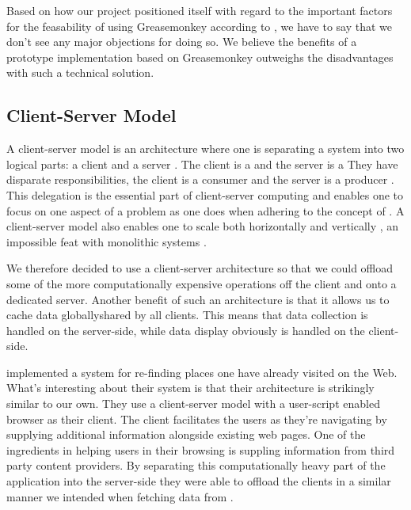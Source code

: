 Based on how our project positioned itself with regard to the important
factors for the feasability of using Greasemonkey
according to \citet{laird07}, we have to say that we
don't see any major objections for doing so.
We believe the benefits of a prototype implementation
based on Greasemonkey outweighs the disadvantages with such a technical
solution.

\subsection{Client-Server Model}

A client-server model is an architecture where one is separating a system into
two logical parts: a client and a server \citep[]{lewandowski98}. The
client is a 
and the server is a 
They have disparate responsibilities, the client is a consumer and the
server is a producer \citep[]{lewandowski98}. This delegation is the
essential part of client-server computing and enables one to focus on one
aspect of a problem as one does when adhering to the concept of
 \citep[]{dijkstra82}.
A client-server model also enables one to scale both horizontally and
vertically%
,
an impossible feat with monolithic systems \citep[]{lewandowski98}.

We therefore decided to use a client-server architecture so that we could
offload some of the more computationally expensive operations off the client
and onto a dedicated server. Another benefit of such an architecture is that
it allows us to cache data globally\dash{}shared by all clients. This means
that data collection is handled on the server-side, while data display
obviously is handled on the client-side.

\citet[--888]{nishimoto06} implemented a system for re-finding places one
have already visited on the Web. What's interesting about their system is that
their architecture is strikingly similar to our own. They use a
client-server model with a user-script enabled browser as their client. The
client facilitates the users as they're navigating by supplying additional
information alongside existing web pages. One of the ingredients in helping
users in their browsing is suppling information from third party content
providers. By separating this computationally heavy part of the application
into the server-side they were able to offload the clients in a similar
manner we intended when fetching data from \urort{}.

